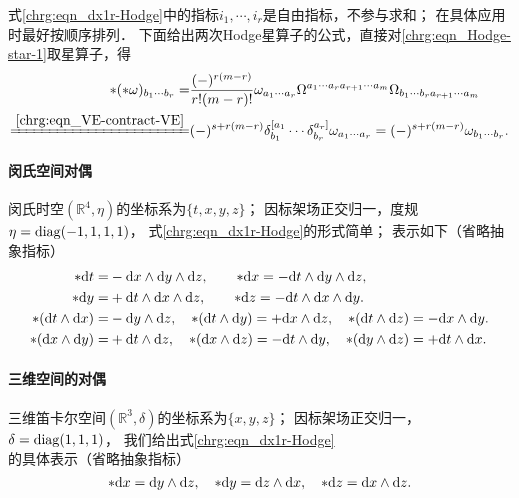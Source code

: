 式\eqref{chrg:eqn_dx1r-Hodge}中的指标$i_1,\cdots,i_r$是自由指标，不参与求和；
在具体应用时最好按顺序排列．
下面给出两次Hodge星算子的公式，直接对\eqref{chrg:eqn_Hodge-star-1}取星算子，得
\begin{equation}\label{chrg:eqn_double-star-Hodge}
\begin{aligned}
    *(*\omega)_{b_1 \cdots b_r} =&  \frac{(-)^{r(m-r)}}{r! (m-r)!} \omega_{a_1 \cdots a_r}
     \Omega^{a_1 \cdots a_r a_{r+1} \cdots a_m}
     \Omega_{{b_1 \cdots b_r} a_{r+1} \cdots a_m} \\
     \xlongequal{\ref{chrg:eqn_VE-contract-VE}} &
     (-)^{s+r(m-r)} \delta^{\lbrack a_1}_{b_1} \cdots \delta^{a_r \rbrack}_{b_r}
     \omega_{a_1 \cdots a_r}
     =(-)^{s+r(m-r)} \omega_{b_1 \cdots b_r} .
\end{aligned}
\end{equation}

\paragraph{闵氏空间对偶} %
闵氏时空$(\mathbb{R}^4,\eta)$的坐标系为$\{t,x,y,z\}$；
因标架场正交归一，度规$\eta={\rm diag}(-1,1,1,1)$，
式\eqref{chrg:eqn_dx1r-Hodge}的形式简单；
表示如下（省略抽象指标）
\begin{align*}
    * {\rm d}t =& -{\rm d}x \wedge {\rm d}y \wedge {\rm d}z , \qquad
    * {\rm d}x =  -{\rm d}t \wedge {\rm d}y \wedge {\rm d}z , \\
    * {\rm d}y =& +{\rm d}t \wedge {\rm d}x \wedge {\rm d}z , \qquad
    * {\rm d}z =  -{\rm d}t \wedge {\rm d}x \wedge {\rm d}y . \\
    * ({\rm d}t \wedge {\rm d}x) =&- {\rm d}y \wedge {\rm d}z, \quad
    * ({\rm d}t \wedge {\rm d}y) = + {\rm d}x \wedge {\rm d}z, \quad
    * ({\rm d}t \wedge {\rm d}z) = - {\rm d}x \wedge {\rm d}y. \\
    * ({\rm d}x \wedge {\rm d}y) =&+ {\rm d}t \wedge {\rm d}z, \quad
    * ({\rm d}x \wedge {\rm d}z) = - {\rm d}t \wedge {\rm d}y, \quad
    * ({\rm d}y \wedge {\rm d}z) = + {\rm d}t \wedge {\rm d}x.
\end{align*}


\paragraph{三维空间的对偶}
三维笛卡尔空间$(\mathbb{R}^3,\delta)$的坐标系为$\{x,y,z\}$；
因标架场正交归一，$\delta={\rm diag}(1,1,1)$，
我们给出式\eqref{chrg:eqn_dx1r-Hodge}的具体表示（省略抽象指标）
\begin{equation}\label{chrg:eqn_Cartesian-Hodge}
    * {\rm d}x = {\rm d}y \wedge {\rm d}z, \quad
    * {\rm d}y = {\rm d}z \wedge {\rm d}x, \quad
    * {\rm d}z = {\rm d}x \wedge {\rm d}z .
\end{equation}

